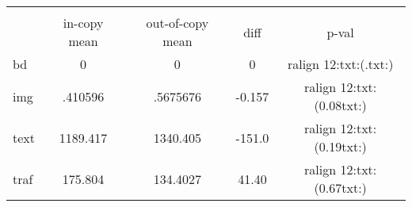{
\def\sym#1{\ifmmode^{#1}\else\(^{#1}\)\fi}
\begin{tabular}{l*{1}{cccc}}
\hline\hline
            &            &            &            &            \\
            &in-copy mean&out-of-copy mean&        diff&       p-val\\
\hline
bd          &           0&           0&           0&{ralign 12:{txt:(}.{txt:)}}\\
img         &     .410596&    .5675676&      -0.157&{ralign 12:{txt:(}0.08{txt:)}}\\
text        &    1189.417&    1340.405&      -151.0&{ralign 12:{txt:(}0.19{txt:)}}\\
traf        &     175.804&    134.4027&       41.40&{ralign 12:{txt:(}0.67{txt:)}}\\
\hline\hline
\end{tabular}
}
